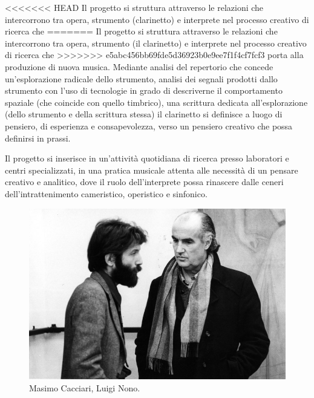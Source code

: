 \documentclass{gs-adonis}
\begin{document}
<<<<<<< HEAD
Il progetto si struttura attraverso le relazioni che intercorrono tra
opera, strumento (clarinetto) e interprete nel processo creativo di ricerca che
=======
Il progetto si struttura attraverso le relazioni che intercorrono tra opera,
strumento (il clarinetto) e interprete nel processo creativo di ricerca che
>>>>>>> e5abc456bb69fde5d36923b0e9ee7f1f4cf7fcf3
porta alla produzione di nuova musica. Mediante analisi del repertorio che
concede un'esplorazione radicale dello strumento, analisi dei segnali prodotti
dallo strumento con l'uso di tecnologie in grado di descriverne il
comportamento spaziale (che coincide con quello timbrico), una scrittura
dedicata all'esplorazione (dello strumento e della scrittura stessa) il
clarinetto si definisce a luogo di pensiero, di esperienza e consapevolezza,
verso un pensiero creativo che possa definirsi in prassi.

Il progetto si inserisce in un'attività quotidiana di ricerca presso laboratori
e centri specializzati, in una pratica musicale attenta alle necessità di un
pensare creativo e analitico, dove il ruolo dell'interprete possa rinascere
dalle ceneri dell'intrattenimento cameristico, operistico e sinfonico.

\begin{figure}[t]
  \centering
  \includegraphics[width=\linewidth]{images/luigi-nono-massimo-cacciari.jpg}
  \captionsetup{width=.81\linewidth}
  \caption{Masimo Cacciari, Luigi Nono.}
  \label{cacciari}
\end{figure}

\end{document}
